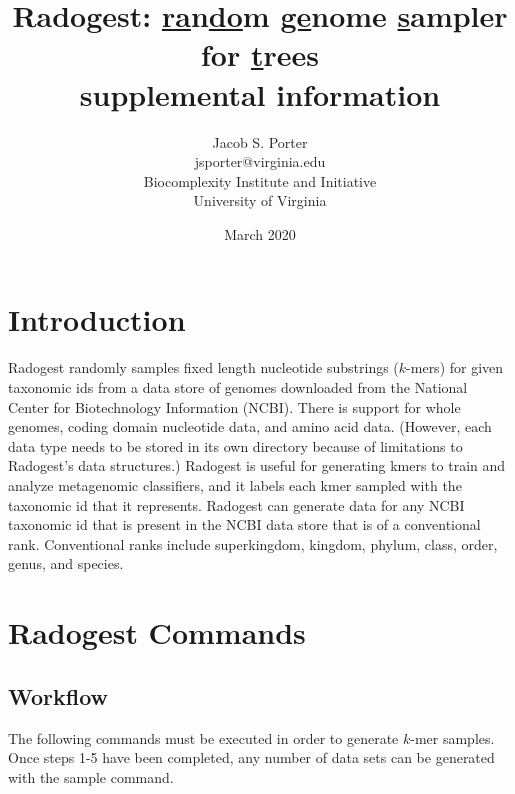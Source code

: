 \documentclass[12pt, letterpaper]{article}
\begin{document}
\title{Radogest: \underline{ra}n\underline{do}m \underline{ge}nome \underline{s}ampler for \underline{t}rees\large\\ supplemental information}
\author{Jacob S. Porter\\jsporter@virginia.edu\\Biocomplexity Institute and Initiative\\University of Virginia\\}
\date{March 2020}
 
 
\begin{titlepage}
\maketitle
\end{titlepage}

\section{Introduction}
Radogest randomly samples fixed length nucleotide substrings ($k$-mers) for given taxonomic ids from a data store of genomes downloaded from the National Center for Biotechnology Information (NCBI).  There is support for whole genomes, coding domain nucleotide data, and amino acid data.  (However, each data type needs to be stored in its own directory because of limitations to Radogest's data structures.)  Radogest is useful for generating kmers to train and analyze metagenomic classifiers, and it labels each kmer sampled with the taxonomic id that it represents.  Radogest can generate data for any NCBI taxonomic id that is present in the NCBI data store that is of a conventional rank.  Conventional ranks include superkingdom, kingdom, phylum, class, order, genus, and species.

\section{Radogest Commands \label{commands}}

\subsection{Workflow}
The following commands must be executed in order to generate $k$-mer samples.  Once steps 1-5 have been completed, any number of data sets can be generated with the sample command.\\
\end{document}
